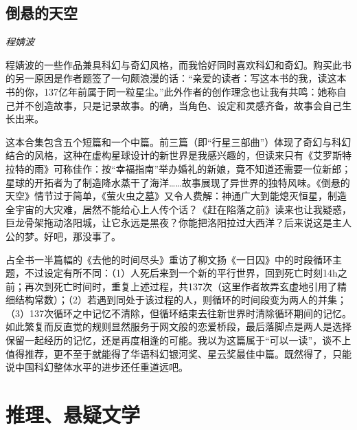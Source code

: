 \subsection*{倒悬的天空}
\par \emph{程婧波} 

\par 程婧波的一些作品兼具科幻与奇幻风格，而我恰好同时喜欢科幻和奇幻。购买此书的另一原因是作者题签了一句颇浪漫的话：“亲爱的读者：写这本书的我，读这本书的你，137亿年前属于同一粒星尘。”此外作者的创作理念也让我有共鸣：她称自己并不创造故事，只是记录故事。的确，当角色、设定和灵感齐备，故事会自己生长出来。
\par 这本合集包含五个短篇和一个中篇。前三篇（即“行星三部曲”）体现了奇幻与科幻结合的风格，这种在虚构星球设计的新世界是我感兴趣的，但读来只有《艾罗斯特拉特的雨》可称佳作：按“幸福指南”举办婚礼的新娘，竟不知道还需要一位新郎；星球的开拓者为了制造降水蒸干了海洋……故事展现了异世界的独特风味。《倒悬的天空》情节过于简单，《萤火虫之墓》又令人费解：神通广大到能熄灭恒星，制造全宇宙的大灾难，居然不能给心上人传个话？《赶在陷落之前》读来也让我疑惑，巨龙骨架拖动洛阳城，让它永远是黑夜？你能把洛阳拉过大西洋？后来说这是主人公的梦。好吧，那没事了。
\par 占全书一半篇幅的《去他的时间尽头》重访了柳文扬《一日囚》中的时段循环主题，不过设定有所不同：（1）人死后来到一个新的平行世界，回到死亡时刻14h之前；再次到死亡时间时，重复上述过程，共137次（这里作者故弄玄虚地引用了精细结构常数）；（2）若遇到同处于该过程的人，则循环的时间段变为两人的并集；（3）137次循环之中记忆不清除，但循环结束去往新世界时清除循环期间的记忆。如此繁复而反直觉的规则显然服务于网文般的恋爱桥段，最后落脚点是两人是选择保留一起经历的记忆，还是再度相逢的可能。我以为这篇属于“可以一读”，谈不上值得推荐，更不至于就能得了华语科幻银河奖、星云奖最佳中篇。既然得了，只能说中国科幻整体水平的进步还任重道远吧。
\par {}


\section{推理、悬疑文学}

